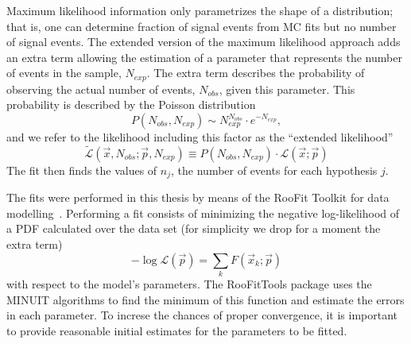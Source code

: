
Maximum likelihood information only parametrizes the shape of a distribution; that is, one can determine fraction of signal events from MC fits but no number of signal events.
The extended version of the maximum likelihood approach adds an extra term
allowing the estimation of %
a parameter that represents the number of events in the sample, $N_{exp}$.
The extra term describes the probability of observing the actual number of events, $N_{obs}$, given this parameter. This probability is described by the Poisson distribution
%
\begin{equation}
P(N_{obs},N_{exp}) \sim  N_{exp}^{N_{obs}} \cdot e^{-N_{exp}},
\end{equation}
%
and we refer to the likelihood including this factor as the ``extended likelihood''
%
\begin{equation}
\tilde{\mathcal{L}}(\vec{x},N_{obs};\vec{p},N_{exp}) \equiv P(N_{obs},N_{exp}) \cdot \mathcal{L}(\vec{x};\vec{p})
\end{equation}
%
The fit then finds the values of $n_j$, the number of events for each hypothesis $j$. 


The fits were performed in this thesis by means of the RooFit Toolkit for data modelling~\cite{RooFit}. Performing a fit consists of minimizing the negative log-likelihood of a PDF calculated over the data set  (for simplicity we drop for a moment the extra term)
%
\begin{equation}
-\log \mathcal{L} (\vec{p}) = \sum_k F(\vec{x}_k;\vec{p})
\end{equation}
%
with respect to the model's parameters.  The RooFitTools package uses the MINUIT\cite{MINUIT} algorithms to find the minimum of this function and estimate the errors in each parameter.  %
To increse the chances of proper convergence, it is important to provide reasonable initial estimates for the parameters to be fitted.


